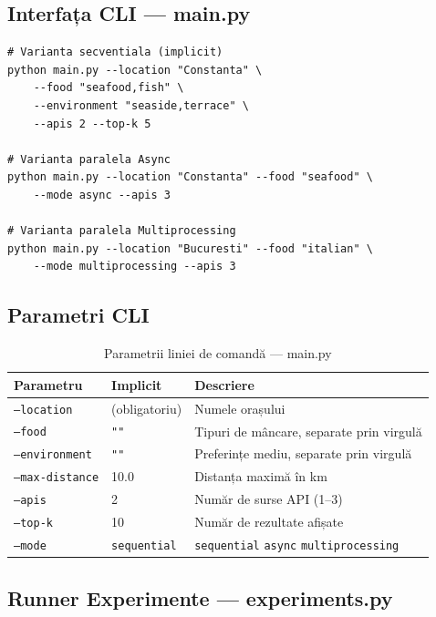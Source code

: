 \documentclass[12pt,a4paper]{article}
\newcommand{\thead}[1]{\cellcolor{tblh}\color{white}\textbf{#1}}
\begin{document}
\subsection{Interfața CLI --- main.py}

\begin{lstlisting}[style=bash]
# Varianta secventiala (implicit)
python main.py --location "Constanta" \
    --food "seafood,fish" \
    --environment "seaside,terrace" \
    --apis 2 --top-k 5

# Varianta paralela Async
python main.py --location "Constanta" --food "seafood" \
    --mode async --apis 3

# Varianta paralela Multiprocessing
python main.py --location "Bucuresti" --food "italian" \
    --mode multiprocessing --apis 3
\end{lstlisting}

\subsection{Parametri CLI}

\begin{table}[H]
\centering
\begin{tabular}{lll}
\toprule
\thead{Parametru} & \thead{Implicit} & \thead{Descriere} \\
\midrule
\texttt{--location}    & (obligatoriu)  & Numele orașului \\
\texttt{--food}        & \texttt{""}    & Tipuri de mâncare, separate prin virgulă \\
\texttt{--environment} & \texttt{""}    & Preferințe mediu, separate prin virgulă \\
\texttt{--max-distance}& 10.0           & Distanța maximă în km \\
\texttt{--apis}        & 2              & Număr de surse API (1--3) \\
\texttt{--top-k}       & 10             & Număr de rezultate afișate \\
\texttt{--mode}        & \texttt{sequential} & \texttt{sequential} \textbar{} \texttt{async} \textbar{} \texttt{multiprocessing} \\
\bottomrule
\end{tabular}
\caption{Parametrii liniei de comandă --- main.py}
\end{table}

\subsection{Runner Experimente --- experiments.py}
\end{document}
